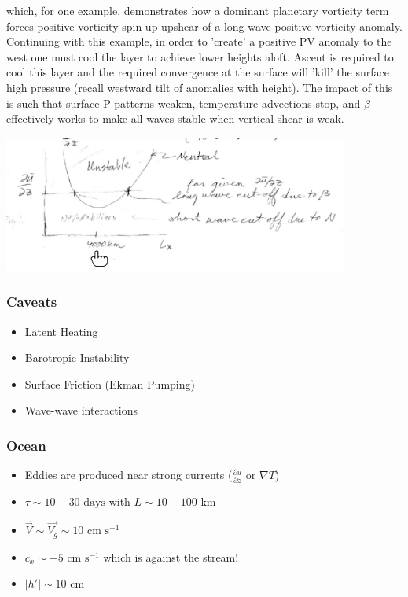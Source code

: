 \documentclass[a4paper,12pt]{article}
\begin{document}
which, for one example, demonstrates how a dominant planetary vorticity term forces positive vorticity spin-up upshear of a long-wave positive vorticity anomaly. Continuing with this example, in order to 'create' a positive PV anomaly to the west one must cool the layer to achieve lower heights aloft. Ascent is required to cool this layer and the required convergence at the surface will 'kill' the surface high pressure (recall westward tilt of anomalies with height). The impact of this is such that surface P patterns weaken, temperature advections stop, and $\beta$ effectively works to make all waves stable when vertical shear is weak.

\includegraphics[width= \textwidth]{4}

\subsubsection*{Caveats}
\begin{itemize}
	\item Latent Heating
	\item Barotropic Instability 
	\item Surface Friction (Ekman Pumping)
	\item Wave-wave interactions
\end{itemize}

\subsubsection*{Ocean}
\begin{itemize}
	\item Eddies are produced near strong currents ($\frac{\partial u}{\partial z}$ or $\nabla T$)
	\item $\tau \sim 10-30 \text{ days}$ with $L \sim 10-100 \text{ km}$
	\item $\vec{V} \sim \vec{V_g} \sim 10 \text{ cm s}^{-1}$
	\item $c_x \sim -5 \text{ cm s}^{-1}$ which is against the stream! 
	\item $|h'| \sim 10 \text{ cm}$
\end{itemize}
\end{document}
